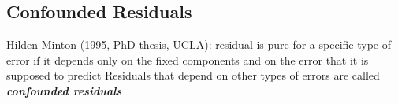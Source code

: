 \documentclass[main.tex]{subfiles}
\begin{document}
\subsection{Confounded Residuals}
Hilden-Minton (1995, PhD thesis, UCLA): residual is pure for a
specific type of error if it depends only on the fixed components and
on the error that it is supposed to predict
Residuals that depend on other types of errors are called \textit{\textbf{confounded
residuals}}
\end{document}
